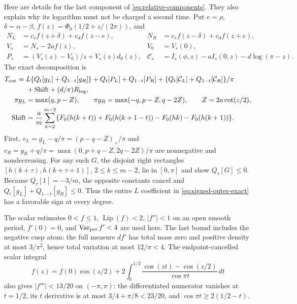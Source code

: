 Here are details for the last component of
\eqref{eq:relative-components}. They also explain why its logarithm
must not be charged a second time. Put $e=\rho$, $\delta=\alpha-\beta$,
$f(z)=\Phi_0(1/2+z/(2\pi))$, and
\begin{align*}
 N_L&=c_ef(z+\delta)+c_df(z-e),&
 N_R&=c_ef(z-\delta)+c_df(z+e),\\
 V_s&=N_s-2af(z),&V_0&=V_s(0),\\
 P_s&=(V_s(z)-V_0)/z+V_s(z)d_0(z),&
 \mathcal C_s&=I_s(\phi,z)-aI_s(0,z)-d\log(\pi-z).
\end{align*}
The exact decomposition is
\begin{align}\label{eq:signed-outer-exact}
 T_{\rm out}={}&L\{Q_t[g_L]+Q_{1-t}[g_R]\}
 +Q_t[P_L]+Q_{1-t}[P_R]
 +\{Q_t[\mathcal C_L]+Q_{1-t}[\mathcal C_R]\}/\pi\\
 &+\mathrm{Shift}+(d/\pi)R_{\log},\notag\\
 \pi g_L&=\max(q,p-Z),\qquad
 \pi g_R=\max(-q,p-Z,q-2Z),\qquad Z=2a\cot(z/2),\notag\\
 \mathrm{Shift}&=\frac am\sum_{k=2}^{m-2}
 \{F_0(h(k+t))+F_0(h(k+1-t))-F_0(hk)-F_0(h(k+1))\}.\notag
\end{align}
First, $v_L=g_L-q/\pi=(p-q-Z)_+/\pi$ and
$v_R=g_R+q/\pi=\max(0,p+q-Z,2q-2Z)/\pi$ are nonnegative and
nondecreasing. For any such $G$, the disjoint right rectangles
$[h(k+\tau),h(k+\tau+1)]$, $2\leq k\leq m-2$, lie in $[0,\pi]$
and show $Q_\tau[G]\leq0$. Because $Q_\tau[1]=-3/m$,
the opposite constants cancel and
$Q_t[g_L]+Q_{1-t}[g_R]\leq0$. Thus the entire $L$ coefficient
in \eqref{eq:signed-outer-exact} has a favorable sign at every degree.

The scalar estimates $0<f\leq1$, $\operatorname{Lip}(f)<2$,
$|f''|<1$ on an open smooth period, $f'(0)=0$, and
$\operatorname{Var}_{\rm per}f'<4$ are used here. The last bound
includes the negative cusp atom: the full measure $df'$ has total
mass zero and positive density at most $3/\pi^2$, hence total
variation at most $12/\pi<4$. The endpoint-cancelled scalar integral
\[
 f(z)=f(0)\cos(z/2)+2\int_0^{1/2}
                \frac{\cos(zt)-\cos(z/2)}{\cos\pi t}\,dt
\]
also gives $|f'''|<13/20$ on $(-\pi,\pi)$: the differentiated
numerator vanishes at $t=1/2$, its $t$ derivative is at most
$3/4+\pi/8<23/20$, and $\cos\pi t\geq2(1/2-t)$.

